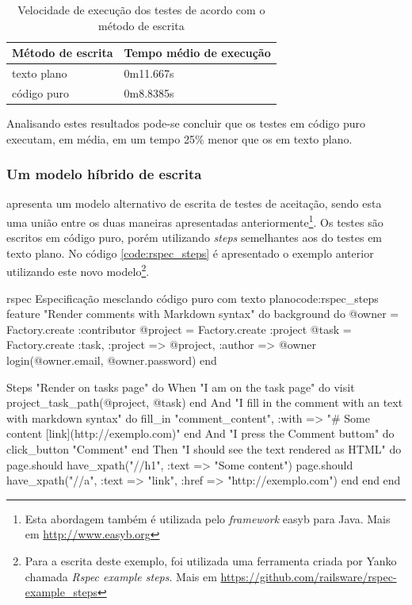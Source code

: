 \begin{table}[ht]
\caption{Velocidade de execução dos testes de acordo com o método de escrita}
\label{table:tempo_de_execucao}
\centering
\begin{tabular}{p{4.5cm} p{6.5cm}}
\toprule
\textbf{Método de escrita} & \textbf{Tempo médio de execução} \\
\midrule[1pt]
texto plano & 0m11.667s \\ \midrule
código puro & 0m8.8385s \\
\bottomrule
\end{tabular}
\end{table}

Analisando estes resultados pode-se concluir que os testes em código puro executam, em média, em um tempo 25\% menor que os em texto plano.


\subsubsection{Um modelo híbrido de escrita}
\label{ssub:um_modelo_hibrido_de_escrita}

 apresenta um modelo alternativo de escrita de testes de aceitação, sendo esta uma união entre os duas maneiras apresentadas anteriormente\footnote{Esta abordagem também é utilizada pelo \textit{framework} easyb para Java. Mais em \url{http://www.easyb.org}}. Os testes são escritos em código puro, porém utilizando \textit{steps} semelhantes aos do testes em texto plano. No código \ref{code:rspec_steps} é apresentado o exemplo anterior utilizando este novo modelo\footnote{Para a escrita deste exemplo, foi utilizada uma ferramenta criada por Yanko chamada \textit{Rspec example steps}. Mais em \url{https://github.com/railsware/rspec-example_steps}}.

\begin{mycode}{rspec}%
{Especificação mesclando código puro com texto plano}{code:rspec_steps}
feature "Render comments with Markdown syntax" do
  background do
    @owner = Factory.create :contributor
    @project = Factory.create :project
    @task = Factory.create :task, :project => @project, :author => @owner
    login(@owner.email, @owner.password)
  end

  Steps "Render on tasks page" do
    When "I am on the task page" do
      visit project_task_path(@project, @task)
    end
    And "I fill in the comment with an text with markdown syntax" do
      fill_in "comment_content", :with => "# Some content [link](http://exemplo.com)"
    end
    And "I press the Comment buttom" do
      click_button "Comment"
    end
    Then "I should see the text rendered as HTML" do
      page.should have_xpath("//h1", :text => "Some content")
      page.should have_xpath("//a", :text => "link", :href => "http://exemplo.com")
    end
  end
end
\end{mycode}

